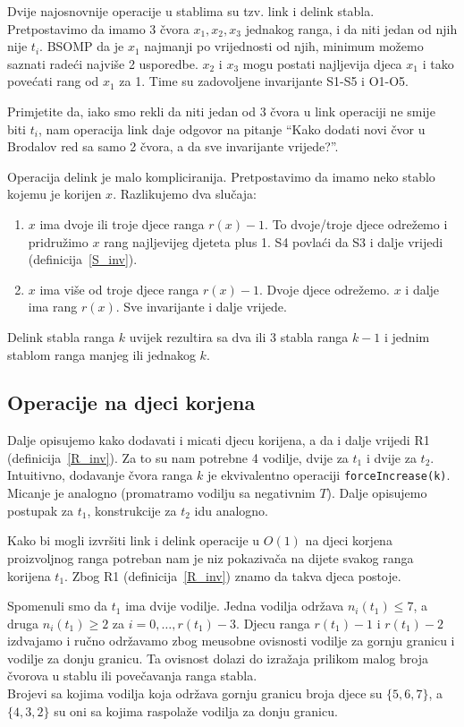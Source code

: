 Dvije najosnovnije operacije u stablima su tzv. link i delink stabla.
Pretpostavimo da imamo 3 \v{c}vora $x_{1}, x_{2}, x_{3}$ jednakog ranga, i da niti jedan od njih nije $t_{i}$.
BSOMP da je $x_{1}$ najmanji po vrijednosti od njih, minimum mo\v{z}emo saznati rade\'{c}i najvi\v{s}e 2 usporedbe.
$x_{2}$ i $x_{3}$ mogu postati najljevija djeca $x_{1}$ i tako pove\'{c}ati rang od $x_{1}$ za 1.
Time su zadovoljene invarijante S1-S5 i O1-O5.

Primjetite da, iako smo rekli da niti jedan od 3 \v{c}vora u link operaciji ne smije biti $t_{i}$, nam operacija link daje odgovor na pitanje ``Kako dodati novi \v{c}vor u Brodalov red sa samo 2 \v{c}vora, a da sve invarijante vrijede?''.

Operacija delink je malo kompliciranija. Pretpostavimo da imamo neko stablo kojemu je korijen $x$. Razlikujemo dva slu\v{c}aja:
\begin{enumerate}
  \item $x$ ima dvoje ili troje djece ranga $r(x) - 1$. To dvoje/troje djece odre\v{z}emo i pridru\v{z}imo $x$ rang najljevijeg djeteta plus 1. S4 povla\'{c}i da S3 i dalje vrijedi (definicija~\ref{S_inv}).
  \item $x$ ima vi\v{s}e od troje djece ranga $r(x) - 1$. Dvoje djece odre\v{z}emo. $x$ i dalje ima rang $r(x)$. Sve invarijante i dalje vrijede.
\end{enumerate}
Delink stabla ranga $k$ uvijek rezultira sa dva ili 3 stabla ranga $k - 1$ i jednim stablom ranga manjeg ili jednakog $k$.

\subsection{Operacije na djeci korjena}

Dalje opisujemo kako dodavati i micati djecu korijena, a da i dalje vrijedi R1 (definicija~\ref{R_inv}).
Za to su nam potrebne 4 vodilje, dvije za $t_{1}$ i dvije za $t_{2}$.
Intuitivno, dodavanje \v{c}vora ranga $k$ je ekvivalentno operaciji \texttt{forceIncrease(k)}.
Micanje je analogno (promatramo vodilju sa negativnim $T$).
Dalje opisujemo postupak za $t_{1}$, konstrukcije za $t_{2}$ idu analogno.

Kako bi mogli izvr\v{s}iti link i delink operacije u $O(1)$ na djeci korjena proizvoljnog ranga potreban nam je niz pokaziva\v{c}a na dijete svakog ranga korijena $t_{1}$.
Zbog R1 (definicija~\ref{R_inv}) znamo da takva djeca postoje.

Spomenuli smo da $t_{1}$ ima dvije vodilje. Jedna vodilja odr\v{z}ava $n_{i}(t_{1}) \le 7$, a druga $n_{i}(t_{1}) \ge 2$ za $i = 0,\dotsc,r(t_{1}) - 3$.
Djecu ranga $r(t_{1}) - 1$ i $r(t_{1}) - 2$ izdvajamo i ru\v{c}no odr\v{z}avamo zbog me\dj usobne ovisnosti vodilje za gornju granicu i vodilje za donju granicu.
Ta ovisnost dolazi do izra\v{z}aja prilikom malog broja \v{c}vorova u stablu ili pove\v{c}avanja ranga stabla.\\
Brojevi sa kojima vodilja koja odr\v{z}ava gornju granicu broja djece su $\{5,6,7\}$, a $\{4,3,2\}$ su oni sa kojima raspola\v{z}e vodilja za donju granicu.
